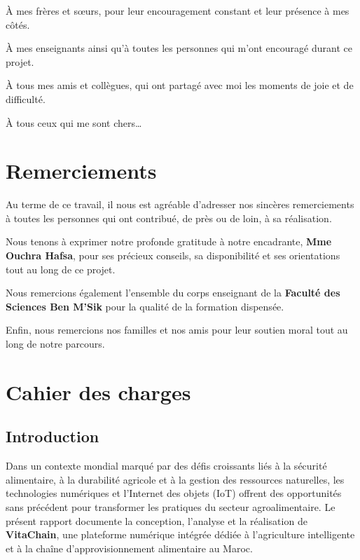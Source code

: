 \documentclass[12pt,a4paper]{report}
\begin{document}
À mes frères et sœurs, pour leur encouragement constant et leur présence à mes côtés.

À mes enseignants ainsi qu'à toutes les personnes qui m'ont encouragé durant ce projet.

À tous mes amis et collègues, qui ont partagé avec moi les moments de joie et de
difficulté.

À tous ceux qui me sont chers\ldots

\newpage

\chapter*{Remerciements}

Au terme de ce travail, il nous est agréable d'adresser nos sincères
remerciements à toutes les personnes qui ont contribué, de près ou de
loin, à sa réalisation.

Nous tenons à exprimer notre profonde gratitude à notre encadrante,
\textbf{Mme Ouchra Hafsa}, pour ses précieux conseils, sa disponibilité
et ses orientations tout au long de ce projet.

Nous remercions également l'ensemble du corps enseignant de la
\textbf{Faculté des Sciences Ben M'Sik} pour la qualité de la formation
dispensée.

Enfin, nous remercions nos familles et nos amis pour leur soutien moral
tout au long de notre parcours.

\newpage

\tableofcontents\newpage
\listoffigures\newpage
\listoftables\newpage

\setcounter{page}{1}

\chapter{Cahier des charges}

\section{Introduction}

Dans un contexte mondial marqué par des défis croissants liés à la sécurité alimentaire,
à la durabilité agricole et à la gestion des ressources naturelles, les technologies
numériques et l'Internet des objets (IoT) offrent des opportunités sans précédent pour
transformer les pratiques du secteur agroalimentaire. Le présent rapport documente la
conception, l'analyse et la réalisation de \textbf{VitaChain}, une plateforme numérique
intégrée dédiée à l'agriculture intelligente et à la chaîne d'approvisionnement
alimentaire au Maroc.
\end{document}
